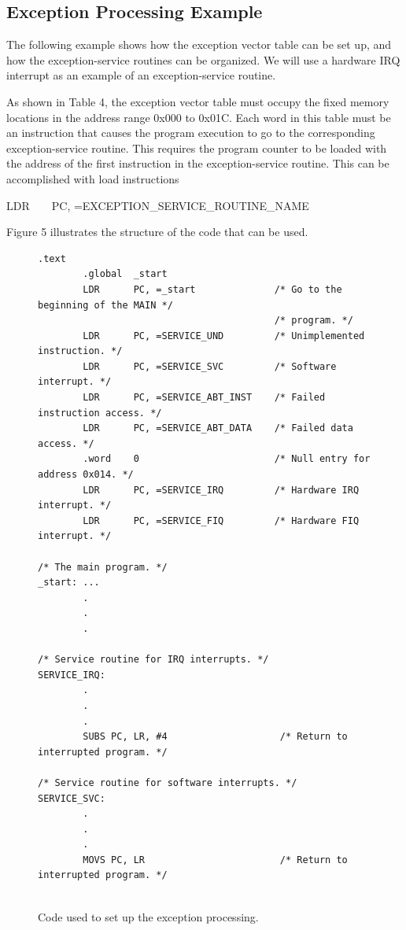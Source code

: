 \documentclass[11pt, twoside, pdftex]{article}
\begin{document}
\subsection{Exception Processing Example}

The following example shows how the exception vector table can be
set up, and how the exception-service routines can be organized.
We will use a hardware IRQ interrupt as an example of an
exception-service routine.

As shown in Table 4, the exception vector table must occupy
the fixed memory locations in the address range 0x000 to 0x01C.
Each word in this table must be an instruction that causes the
program execution to go to the corresponding exception-service
routine. This requires the program counter to be loaded with
the address of the first instruction in the exception-service
routine. This can be accomplished with load instructions
\begin{center}
LDR~~~~PC, =EXCEPTION\_SERVICE\_ROUTINE\_NAME
\end{center}
Figure 5 illustrates the structure of the code that can be used.

\begin{figure}[H]
\begin{center} %
\begin{lstlisting}[style=defaultArmStyle]
        .text
        .global  _start
        LDR      PC, =_start              /* Go to the beginning of the MAIN */
                                          /* program. */
        LDR      PC, =SERVICE_UND         /* Unimplemented instruction. */
        LDR      PC, =SERVICE_SVC         /* Software interrupt. */
        LDR      PC, =SERVICE_ABT_INST    /* Failed instruction access. */
        LDR      PC, =SERVICE_ABT_DATA    /* Failed data access. */
        .word    0                        /* Null entry for address 0x014. */
        LDR      PC, =SERVICE_IRQ         /* Hardware IRQ interrupt. */
        LDR      PC, =SERVICE_FIQ         /* Hardware FIQ interrupt. */
				
/* The main program. */
_start: ...
        .
        .
        .
				
/* Service routine for IRQ interrupts. */
SERVICE_IRQ:
        .
        .
        .
        SUBS PC, LR, #4                    /* Return to interrupted program. */

/* Service routine for software interrupts. */
SERVICE_SVC:
        .
        .
        .
        MOVS PC, LR                        /* Return to interrupted program. */
	

\end{lstlisting} %
\end{center}
	\vspace{-0.33in}
	\caption{Code used to set up the exception processing.}
	\label{fig:5}
\end{figure}
\end{document}
